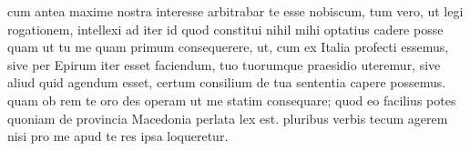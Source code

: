 


cum antea maxime nostra interesse arbitrabar te esse nobiscum, tum vero, ut
            legi rogationem, intellexi ad iter id quod constitui nihil mihi optatius cadere posse
            quam ut tu me quam primum consequerere, ut, cum ex Italia profecti essemus,
            sive per Epirum iter esset faciendum, tuo tuorumque praesidio uteremur,
            sive aliud quid agendum esset, certum consilium de tua sententia capere possemus. quam ob rem te oro des operam ut me statim consequare; quod eo facilius
            potes quoniam de provincia Macedonia perlata lex est. pluribus verbis tecum agerem nisi pro me apud te res ipsa loqueretur.

